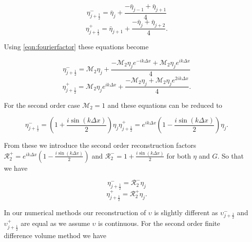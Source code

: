 \begin{equation*}
\eta^-_{j+\frac{1}{2}} = \bar{\eta}_j + \frac{- \bar{\eta}_{j - 1} + \bar{\eta}_{j+ 1} }{4}
\end{equation*}
\begin{equation*}
\eta^+_{j+\frac{1}{2}} = \bar{\eta}_{j+1} + \frac{- \bar{\eta}_{j} + \bar{\eta}_{j+ 2}}{4}.
\end{equation*}
	
Using \eqref{eqn:fourierfactor} these equations become


\begin{equation*}
\eta^-_{j+\frac{1}{2}} = \mathcal{M}_2{\eta}_j + \frac{- \mathcal{M}_2{\eta}_{j} e^{-ik\Delta x} + \mathcal{M}_2{\eta}_{j} e^{ik\Delta x}}{4}
\end{equation*}
\begin{equation*}
\eta^+_{j+\frac{1}{2}} = \mathcal{M}_2{\eta}_{j}e^{ik\Delta x} + \frac{- \mathcal{M}_2{\eta}_{j} + \mathcal{M}_2{\eta}_{j}e^{2ik\Delta x} }{4}.
\end{equation*}


For the second order case $\mathcal{M}_2 = 1$ and these equations can be reduced to 

\begin{subequations}
	\label{eqn:2ndrecon}
	\begin{equation}
	\eta^-_{j+\frac{1}{2}} = \left(1  + \frac{i\sin\left(k\Delta x\right)}{2} \right){\eta}_j
	\end{equation}
	\begin{equation}
	\eta^+_{j+\frac{1}{2}} = e^{ik\Delta x}\left(1  - \frac{i\sin\left(k\Delta x\right)}{2} \right){\eta}_{j}.
	\end{equation}
\end{subequations}

From these we introduce the second order reconstruction factors $\mathcal{R}^+_2 = e^{ik\Delta x}\left(1  - \frac{i\sin\left(k\Delta x\right)}{2} \right)$ and $\mathcal{R}^-_2 = 1  + \frac{i\sin\left(k\Delta x\right)}{2}$ for both $\eta$ and $G$. So that we have 

\begin{equation*}
\eta^-_{j+\frac{1}{2}} = \mathcal{R}^-_2 {\eta}_j
\end{equation*}
\begin{equation*}
\eta^+_{j+\frac{1}{2}} = \mathcal{R}^+_2{\eta}_{j}.
\end{equation*}

In our numerical methods our reconstruction of $\upsilon$ is slightly different as $\upsilon ^-_{j+\frac{1}{2}}$ and $\upsilon ^+_{j+\frac{1}{2}}$ are equal as we assume $\upsilon$ is continuous. For the second order finite difference volume method we have

